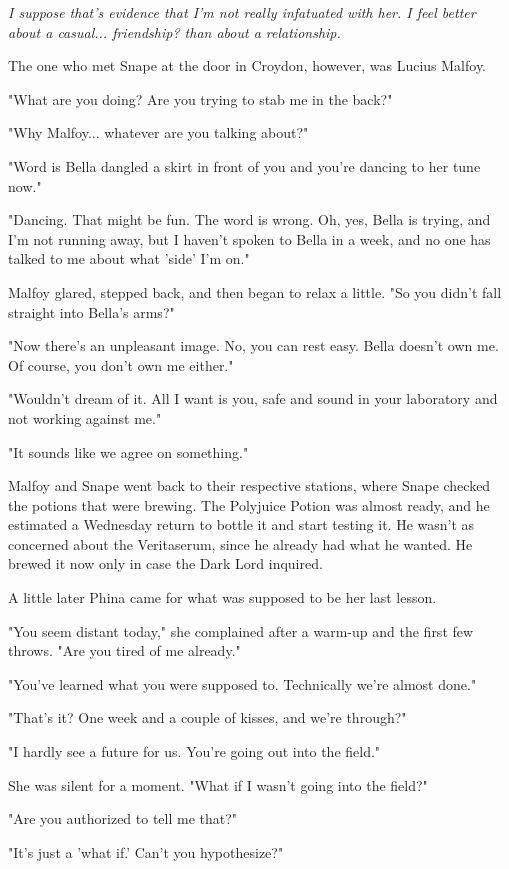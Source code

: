 \documentclass[a4paper,11pt]{article}
\begin{document}
\emph{I suppose that's evidence that I'm not really infatuated with her. I feel better about a casual... friendship? than about a relationship.}

The one who met Snape at the door in Croydon, however, was Lucius Malfoy.

"What are you doing? Are you trying to stab me in the back?"

"Why Malfoy... whatever are you talking about?"

"Word is Bella dangled a skirt in front of you and you're dancing to her tune now."

"Dancing. That might be fun. The word is wrong. Oh, yes, Bella is trying, and I'm not running away, but I haven't spoken to Bella in a week, and no one has talked to me about what 'side' I'm on."

Malfoy glared, stepped back, and then began to relax a little. "So you didn't fall straight into Bella's arms?"

"Now there's an unpleasant image. No, you can rest easy. Bella doesn't own me. Of course, you don't own me either."

"Wouldn't dream of it. All I want is you, safe and sound in your laboratory and not working against me."

"It sounds like we agree on something."

Malfoy and Snape went back to their respective stations, where Snape checked the potions that were brewing. The Polyjuice Potion was almost ready, and he estimated a Wednesday return to bottle it and start testing it. He wasn't as concerned about the Veritaserum, since he already had what he wanted. He brewed it now only in case the Dark Lord inquired.

A little later Phina came for what was supposed to be her last lesson.

"You seem distant today," she complained after a warm-up and the first few throws. "Are you tired of me already."

"You've learned what you were supposed to. Technically we're almost done."

"That's it? One week and a couple of kisses, and we're through?"

"I hardly see a future for us. You're going out into the field."

She was silent for a moment. "What if I wasn't going into the field?"

"Are you authorized to tell me that?"

"It's just a 'what if.' Can't you hypothesize?"
\end{document}
